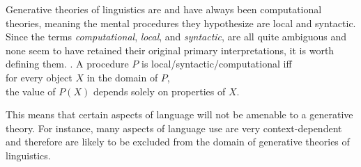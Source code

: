 \documentclass[MilwayThesis]{subfiles}
\begin{document}
Generative theories of linguistics are and have always been computational theories, meaning the mental procedures they hypothesize are local and syntactic.
Since the terms \textit{computational}, \textit{local}, and \textit{syntactic}, are all quite ambiguous and none seem to have retained their original primary interpretations, it is worth defining them.
\ex. A procedure $P$ is local/syntactic/computational iff\\
for every object $X$ in the domain of $P$,\\
the value of $P(X)$ depends solely on properties of $X$.

This means that certain aspects of language will not be amenable to a generative theory.
For instance, many aspects of language use are very context-dependent and therefore are likely to be excluded from the domain of generative theories of linguistics.
\end{document}
